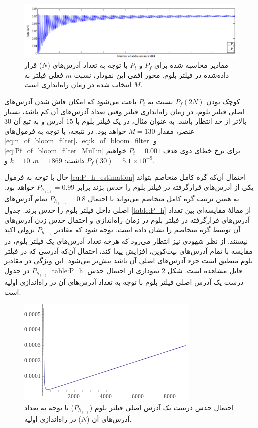 \begin{figure}
	\centering
	\includegraphics[width=\linewidth]{image/Pt_vs_Pf}
	\caption{
		مقادیر محاسبه شده برای $P_f$ و $P_t$ با توجه به تعداد آدرس‌های ($N$) قرار داده‌شده در فیلتر بلوم. محور افقی این نمودار، نسبت $m$ فعلی فیلتر به $M$ انتخاب شده در زمان راه‌اندازی است.
		\cite{Gervais2014}}
	\label{fig:ptvspf}
\end{figure}

کوچک بودن 
$P_f(2N)$
نسبت به  
$P_t$
باعث می‌شود که امکان فاش شدن آدرس‌های اصلی فیلتر بلوم، در زمان راه‌اندازی فیلتر وقتی تعداد آدرس‌های آن کم باشد، بسیار بالاتر از حد انتظار باشد. به عنوان مثال، در یک فیلتر بلوم با $15$ آدرس و به تبع آن $30$ عنصر، مقدار $M=130$ خواهد بود. در نتیجه، با توجه به فرمول‌های 
\eqref{eq:n_of_bloom_filter}،
\eqref{eq:k_of_bloom_filter} و
\eqref{eq:Pf_of_bloom_filter_Mullin}
 برای نرخ خطای دوی هدف
$P_t=0.001$
 خواهیم داشت:
$n=1869$،
$k=10$ و
$P_f(30)=5.1\times10^{-9}$.

حال با توجه به فرمول \eqref{eq:P_h_estimation} احتمال آن‌که گره کامل متخاصم بتواند  یکی از آدرس‌های قرارگرفته در فیلتر بلوم را حدس بزند برابر 
$P_{h_{(1)}} = 0.99$
خواهد بود. به همین ترتیب گره کامل متخاصم می‌تواند با احتمال
$P_{h_{(15)}} = 0.8$
تمام آدرس‌های اصلی داخل فیلتر بلوم را حدس بزند. جدول \ref{table:P_h} از مقالهٔ \cite{Gervais2014} مقایسه‌ای بین تعداد آدرس‌های قرارگرفته در فیلتر بلوم در زمان راه‌اندازی و احتمال حدس زدن آدرس‌های آن توسط گره متخاصم را نشان داده است. توجه شود که مقادیر
$P_{h_{(.)}}$
نزولی اکید نیستند. از نظر شهودی نیز انتظار می‌رود که هرچه تعداد آدرس‌های یک فیلتر بلوم، در مقایسه با تمام آدرس‌های بیت‌کوین، افزایش پیدا کند، احتمال آن‌که آدرسی که در فیلتر بلوم منطبق است جزء آدرس‌های اصلی آن باشد بیش‌تر می‌شود. این ویژگی در مقادیر 
$P_{h_{(1)}}$
در جدول \ref{table:P_h} قابل مشاهده است. شکل \ref{fig:ph1} نموداری از احتمال حدس درست یک آدرس اصلی فیلتر بلوم با توجه به تعداد آدرس‌های آن در راه‌اندازی اولیه است. 
\begin{figure}
	\centering
	\includegraphics[width=0.7\linewidth]{image/P_h_1}
	\caption{%
		احتمال حدس درست یک آدرس اصلی فیلتر بلوم 
		($P_{h_{(1)}}$)
		با توجه به تعداد آدرس‌های آن ($N$) در راه‌اندازی اولیه.}
	\label{fig:ph1}
\end{figure}


